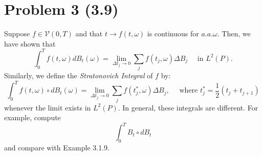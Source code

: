 \documentclass[11pt]{article}
\newcommand{\go}{\omega}
\newcommand{\gw}{\go}
\begin{document}
 \section*{Problem 3 (3.9)}
 Suppose $f \in \mathcal { V } ( 0 , T )$ and that $t \rightarrow f ( t , \omega )$ is continuous for $a.a. \gw$.  Then, we have shown that
 $$
\int _ { 0 } ^ { T } f ( t , \omega ) d B _ { t } ( \omega ) = \lim _ { \Delta t _ { j } \rightarrow 0 } \sum _ { j } f \left( t _ { j } , \omega \right) \Delta B _ { j } \quad \text { in } L ^ { 2 } ( P ).
$$
Similarly, we define the \textit{Stratonovich Integral} of $f$ by:
$$
\int _ { 0 } ^ { T } f ( t , \omega ) \circ d B _ { t } ( \omega ) = \lim _ { \Delta t _ { j } \rightarrow 0 } \sum _ { j } f \left( t _ { j } ^ { * } , \omega \right) \Delta B _ { j } , \quad \text { where } t _ { j } ^ { * } = \frac { 1 } { 2 } \left( t _ { j } + t _ { j + 1 } \right)
$$
whenever the limit exists in $L ^ { 2 } ( P )$.  In general, these integrals are different.  For example, compute 
$$
\int _ { 0 } ^ { T } B _ { t } \circ d B _ { t }
$$
and compare with Example 3.1.9.
\end{document}
